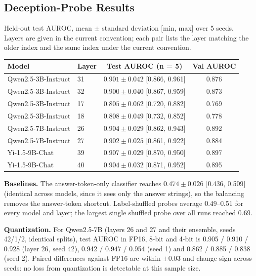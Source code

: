 \documentclass[11pt,letterpaper]{article}
\let\origsubsection\subsection
\renewcommand{\subsection}{\needspace{8\baselineskip}\origsubsection}}
\begin{document}
\subsection{Deception-Probe Results}

Held-out test AUROC, mean $\pm$ standard deviation [min, max] over 5 seeds. Layers are given in the current convention; each pair lists the layer matching the older index and the same index under the current convention.

\begin{center}
\begin{tabular}{llcc}
\toprule
\textbf{Model} & \textbf{Layer} & \textbf{Test AUROC (n = 5)} & \textbf{Val AUROC} \\
\midrule
\rowcolor{backgroundgray} Qwen2.5-3B-Instruct & 31 & $0.901 \pm 0.042$ [0.866, 0.961] & 0.876 \\
Qwen2.5-3B-Instruct & 32 & $0.900 \pm 0.040$ [0.867, 0.959] & 0.873 \\
\rowcolor{backgroundgray} Qwen2.5-3B-Instruct & 17 & $0.805 \pm 0.062$ [0.720, 0.882] & 0.769 \\
Qwen2.5-3B-Instruct & 18 & $0.808 \pm 0.049$ [0.732, 0.852] & 0.778 \\
\rowcolor{backgroundgray} Qwen2.5-7B-Instruct & 26 & $0.904 \pm 0.029$ [0.862, 0.943] & 0.892 \\
Qwen2.5-7B-Instruct & 27 & $0.902 \pm 0.025$ [0.861, 0.922] & 0.884 \\
\rowcolor{backgroundgray} Yi-1.5-9B-Chat & 39 & $0.907 \pm 0.029$ [0.870, 0.950] & 0.897 \\
Yi-1.5-9B-Chat & 40 & $0.904 \pm 0.032$ [0.871, 0.952] & 0.895 \\
\bottomrule
\end{tabular}
\end{center}

\textbf{Baselines.} The answer-token-only classifier reaches $0.474 \pm 0.026$ [0.436, 0.509] (identical across models, since it sees only the answer strings), so the balancing removes the answer-token shortcut. Label-shuffled probes average 0.49--0.51 for every model and layer; the largest single shuffled probe over all runs reached 0.69.

\textbf{Quantization.} For Qwen2.5-7B (layers 26 and 27 and their ensemble, seeds 42/1/2, identical splits), test AUROC in FP16, 8-bit and 4-bit is 0.905 / 0.910 / 0.928 (layer 26, seed 42), 0.942 / 0.947 / 0.954 (seed 1) and 0.862 / 0.885 / 0.838 (seed 2). Paired differences against FP16 are within $\pm 0.03$ and change sign across seeds: no loss from quantization is detectable at this sample size.
\end{document}
